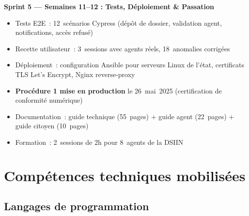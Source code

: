 \documentclass[a4paper,11pt]{article}
\begin{document}
\vspace{0.6em}

\begin{mdframed}[style=SprintBox]
{\sffamily\bfseries\color{InstitBlue}
  Sprint 5 --- Semaines 11--12 : Tests, D\'{e}ploiement \& Passation}
\begin{itemize}
  \item Tests E2E~: 12~sc\'{e}narios Cypress (d\'{e}p\^{o}t de dossier, validation agent,
        notifications, acc\`{e}s refus\'{e})
  \item Recette utilisateur~: 3~sessions avec agents r\'{e}els, 18~anomalies corrig\'{e}es
  \item D\'{e}ploiement~: configuration Ansible pour serveurs Linux de l'\'{e}tat,
        certificats TLS Let's Encrypt, Nginx reverse-proxy
  \item \textbf{Proc\'{e}dure 1 mise en production} le 26~mai~2025
        (certification de conformit\'{e} num\'{e}rique)
  \item Documentation~: guide technique (55~pages) + guide agent (22~pages) + guide citoyen (10~pages)
  \item Formation~: 2~sessions de 2h pour 8~agents de la DSIIN
\end{itemize}
\end{mdframed}

\clearpage

\section{Comp\'{e}tences techniques mobilis\'{e}es}
\label{sec:competences}

\subsection{Langages de programmation}
\end{document}
